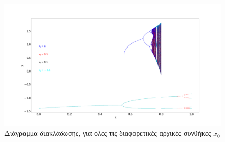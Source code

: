 \begin{figure}[ht]
	\centering
	\includegraphics[width=1\linewidth]{LateX images/graphs q14/g30}
	\caption{Διάγραμμα διακλάδωσης, για όλες τις διαφορετικές αρχικές συνθήκες $x_0$}
	\label{f:g231}
\end{figure}

